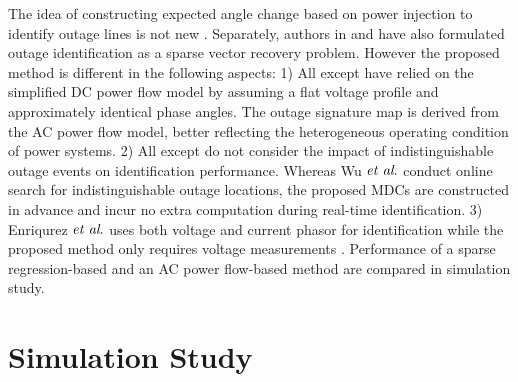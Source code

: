 The idea of constructing expected angle change based on power injection to identify outage lines is not new \cite{Tate2008,Wu2015,Costilla-Enriquez2019}. Separately, authors in \cite{Zhu2012} and \cite{Chen2014} have also formulated outage identification as a sparse vector recovery problem. However the proposed method is different in the following aspects: 1) All except \cite{Costilla-Enriquez2019} have relied on the simplified DC power flow model by assuming a flat voltage profile and approximately identical phase angles. The outage signature map is derived from the AC power flow model, better reflecting the heterogeneous operating condition of power systems. 2) All except \cite{Wu2015} do not consider the impact of indistinguishable outage events on identification performance. Whereas Wu $\textit{et al}.$ conduct online search for indistinguishable outage locations, the proposed MDCs are constructed in advance and incur no extra computation during real-time identification. 3) Enriqurez $\textit{et al}.$ uses both voltage and current phasor for identification while the proposed method only requires voltage measurements \cite{Costilla-Enriquez2019}. Performance of a sparse regression-based \cite{Zhu2012} and an AC power flow-based method \cite{Costilla-Enriquez2019} are compared in simulation study.



\section{Simulation Study}
\label{ch5:sec:simulation}


